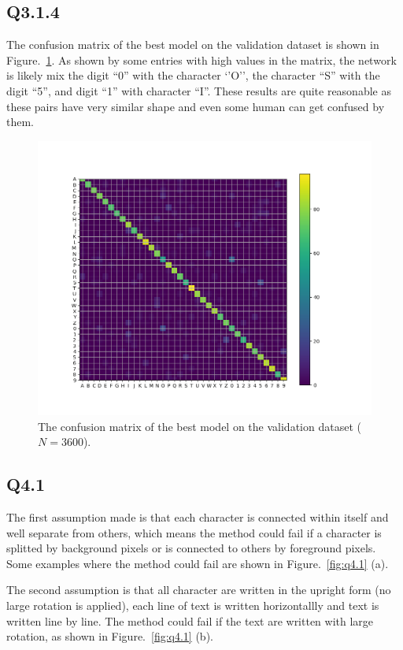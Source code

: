 \documentclass[11pt]{article}
\begin{document}
\newpage

\subsection*{Q3.1.4}

The confusion matrix of the best model on the validation dataset is shown in Figure.~\ref{fig:q3.1.4}. As shown by some entries with high values in the matrix, the network is likely mix the digit ``0'' with the character `'O'', the character ``S'' with the digit ``5'', and digit ``1'' with character ``I''. These results are quite reasonable as these pairs have very similar shape and even some human can get confused by them.

\begin{figure}[h!]
    \centering
    \includegraphics[width=.8\linewidth]{../results/q3_1_4.png}
    \caption{The confusion matrix of the best model on the validation dataset ($N=3600$). }
    \label{fig:q3.1.4}
\end{figure}

\newpage

\subsection*{Q4.1}

The first assumption made is that each character is connected within itself and well separate from others, which means the method could fail if a character is splitted by background pixels or is connected to others by foreground pixels. Some examples where the method could fail are shown in Figure.~\ref{fig:q4.1} (a).

The second assumption is that all character are written in the upright form (no large rotation is applied), each line of text is written horizontallly and text is written line by line. The method could fail if the text are written with large rotation, as shown in Figure.~\ref{fig:q4.1} (b).
\end{document}
